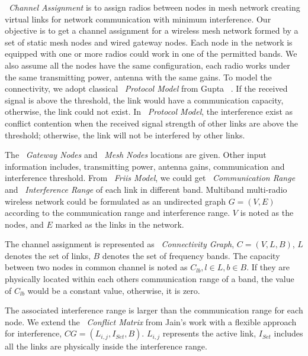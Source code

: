 ~\emph{Channel Assignment} is to assign radios between nodes in mesh network creating virtual links for network communication with minimum interference.
Our objective is to get a channel assignment for a wireless mesh network formed by a set of static mesh nodes and wired gateway nodes. 
Each node in the network is equipped with one or more radios could work in one of the permitted bands. 
We also assume all the nodes have the same configuration, each radio works under the same transmitting power, antenna with the same gains.
To model the connectivity, we adopt classical ~\emph{Protocol Model} from Gupta ~\cite{gupta2000capacity}. If the received signal is above the threshold, the link would have a communication capacity, otherwise, the link could not exist.
In ~\emph{Protocol Model}, the interference exist as conflict contention when the received signal strength of other links are above the threshold; otherwise, the link will not be interfered by other links.

The ~\emph{Gateway Nodes} and ~\emph{Mesh Nodes} locations are given. 
Other input information includes, transmitting power, antenna gains, communication and interference threshold. From ~\emph{Friis Model}, we could get ~\emph{Communication Range} and ~\emph{Interference Range} of each link in different band. 
Multiband multi-radio wireless network could be formulated as an undirected graph $G=(V,E)$ according to the communication range and interference range. $V$ is noted as the nodes, and $E$ marked as the links in the network.

The channel assignment is represented as ~\emph{Connectivity Graph}, $C=(V,L,B)$, $L$ denotes the set of links, $B$ denotes the set of frequency bands. 
The capacity between two nodes in common channel is noted as $C_{lb}, l \in L,b \in B$. If they are physically located within each others communication range of a band, the value of $C_{lb}$ would be a constant value, otherwise, it is zero. 

The associated interference range is larger than the communication range for each node. We extend the ~\emph{Conflict Matrix} from Jain's work with a flexible approach for interference, $CG=(L_{i,j},I_{Set},B)$. $L_{i,j}$ represents the active link, $I_{Set}$ includes all the links are physically inside the interference range. 

